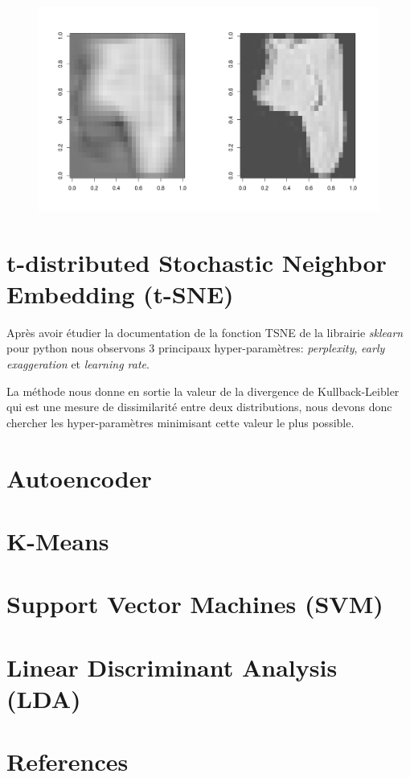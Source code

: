 \documentclass{article}
\begin{document}
\begin{figure}[H] 
\centering
\includegraphics[width=\textwidth, trim=0 0 0 5cm]{pca_reconst_9.png}
\label{fig:pca_ellipse}
\end{figure}

\section{t-distributed Stochastic Neighbor Embedding (t-SNE)}

Après avoir étudier la documentation de la fonction TSNE de la librairie \textit{sklearn} pour python nous observons 3 principaux hyper-paramètres: \textit{perplexity}, \textit{early exaggeration} et \textit{learning rate}. 

La méthode nous donne en sortie la valeur de la divergence de Kullback-Leibler qui est une mesure de dissimilarité entre deux distributions, nous devons donc chercher les hyper-paramètres minimisant cette valeur le plus possible.

\section{Autoencoder}

\section{K-Means}

\section{Support Vector Machines (SVM)}

\section{Linear Discriminant Analysis (LDA)}

\section*{References}
\end{document}
